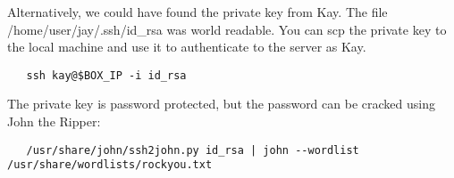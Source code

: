 \documentclass{article}
\begin{document}
Alternatively, we could have found the private key from Kay. The file /home/user/jay/.ssh/id\_rsa was world readable. You can scp the private key to the local machine and use it to authenticate to the server as Kay. 

\begin{lstlisting}
   ssh kay@$BOX_IP -i id_rsa
\end{lstlisting}


The private key is password protected, but the password can be cracked using John the Ripper:

\begin{lstlisting}
   /usr/share/john/ssh2john.py id_rsa | john --wordlist /usr/share/wordlists/rockyou.txt
\end{lstlisting}
\end{document}
